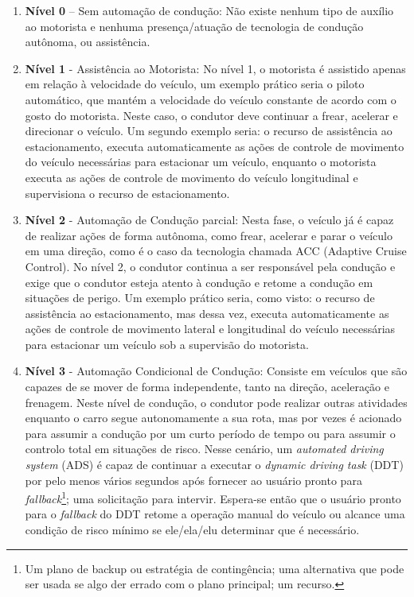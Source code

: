 \begin{enumerate} \label{SAE-level}
 \item \textbf{Nível 0} – Sem automação de condução: Não existe nenhum tipo de auxílio ao motorista e nenhuma presença/atuação de tecnologia de condução autônoma, ou assistência.

\item \textbf{Nível 1} - Assistência ao Motorista: No nível 1, o motorista é assistido apenas em relação à velocidade do veículo, um exemplo prático seria o piloto automático, que mantém a velocidade do veículo constante de acordo com o gosto do motorista. Neste caso, o condutor deve continuar a frear, acelerar e direcionar o veículo. Um segundo exemplo seria: o recurso de assistência ao estacionamento, executa automaticamente as ações de controle de movimento do veículo necessárias para estacionar um veículo, enquanto o motorista executa as ações de controle de movimento do veículo longitudinal e supervisiona o recurso de estacionamento.

\item \textbf{Nível 2} - Automação de Condução parcial: Nesta fase, o veículo já é capaz de realizar ações de forma autônoma, como frear, acelerar e parar o veículo em uma direção, como é o caso da tecnologia chamada ACC (Adaptive Cruise Control). No nível 2, o condutor continua a ser responsável pela condução e exige que o condutor esteja atento à condução e retome a condução em situações de perigo. Um exemplo prático seria, como visto: o recurso de assistência ao estacionamento, mas dessa vez, executa automaticamente as ações de controle de movimento lateral e longitudinal do veículo necessárias para estacionar um veículo sob a supervisão do motorista.

\item \textbf{Nível 3} - Automação Condicional de Condução: Consiste em veículos que são capazes de se mover de forma independente, tanto na direção, aceleração e frenagem. Neste nível de condução, o condutor pode realizar outras atividades enquanto o carro segue autonomamente a sua rota, mas por vezes é acionado para assumir a condução por um curto período de tempo ou para assumir o controlo total em situações de risco. Nesse cenário, um \textit{automated driving system} (ADS)  é capaz de continuar a executar o \textit{dynamic driving task} (DDT) por pelo menos vários segundos após fornecer ao usuário pronto para \textit{fallback}\footnote{Um plano de backup ou estratégia de contingência; uma alternativa que pode ser usada se algo der errado com o plano principal; um recurso.}; uma solicitação para intervir. Espera-se então que o usuário pronto para o \textit{fallback} do DDT retome a operação manual do veículo ou alcance uma condição de risco mínimo se ele/ela/elu determinar que é necessário.


\end{enumerate}
